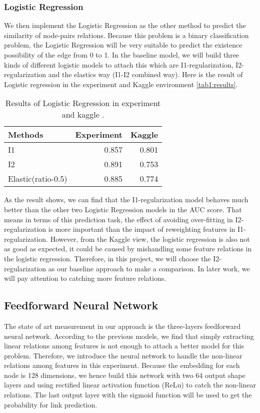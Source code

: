 \documentclass[a4paper,11pt]{article}
\begin{document}
\subsubsection{Logistic Regression}
We then implement the Logistic Regression as the other method to predict the similarity of node-pairs relations. Because this problem is a binary classification problem, the Logistic Regression will be very suitable to predict the existence possibility of the edge from 0 to 1. In the baseline model, we will build three kinds of different logistic models to attach this which are I1-regularization, I2-regularization and the elastics way (I1-I2 combined way). Here is the result of Logistic regression in the experiment and Kaggle environment \autoref{tab1:results}.


\begin{table}[h]
  \centering
  \begin{tabular}{lrr}
    \toprule
    Methods & Experiment & Kaggle \\
    \midrule
    I1  & 0.857& 0.801 \\
    I2  & 0.891 & 0.753 \\
    Elastic(ratio-0.5) & 0.885 & 0.774 \\
    \bottomrule
  \end{tabular}
  \caption{Results of Logistic Regression in experiment and kaggle .}\label{tab1:results}
\end{table}

As the result shows, we can find that the I1-regularization model behaves much better than the other two Logistic Regression models in the AUC score. That means in terms of this prediction task, the effect of avoiding over-fitting in I2-regularization is more important than the impact of reweighting features in I1-regularization. However, from the Kaggle view, the logistic regression is also not as good as expected, it could be caused by mishandling some feature relations in the logistic regression. Therefore, in this project, we will choose the I2-regularization as our baseline approach to make a comparison. In later work, we will pay attention to catching more feature relations.


\subsection{Feedforward Neural Network}

The state of art measurement in our approach is the three-layers feedforward neural network. According to the previous models, we find that simply extracting linear relations among features is not enough to attach a better model for this problem. Therefore, we introduce the neural network to handle the non-linear relations among features in this experiment. Because the embedding for each node is 128 dimensions, we hence build this network with two 64 output shape layers and using rectified linear activation function (ReLu) to catch the non-linear relations. The last output layer with the sigmoid function will be used to get the probability for link prediction. 
\end{document}
